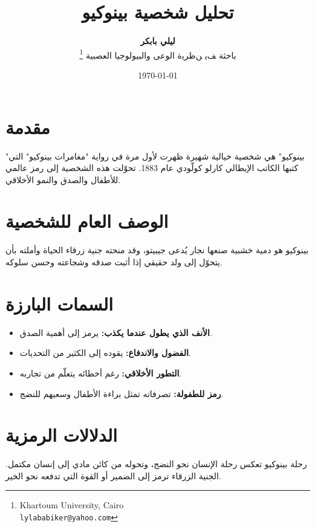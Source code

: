 \documentclass[12pt]{article}
\title{تحليل شخصية بينوكيو}
\author{\textbf{ليلي بابكر}\\    \small باحثة  ﻒﻳ ﻦﻇﺮﻳﺓ الوعى والبيولوجيا العصبية  \thanks{\textenglish{Khartoum University, Cairo \\ \texttt{lylababiker@yahoo.com}}}       }
\date{\today}
\begin{document}
\maketitle

\section{مقدمة}

\begin{flushright} "بينوكيو" هي شخصية خيالية شهيرة ظهرت لأول مرة في رواية "مغامرات بينوكيو" التي كتبها الكاتب الإيطالي كارلو كولّودي عام 1883. تحوّلت هذه الشخصية إلى رمز عالمي للأطفال والصدق والنمو الأخلاقي. \end{flushright}

\section{الوصف العام للشخصية}

\begin{flushright} بينوكيو هو دمية خشبية صنعها نجار يُدعى جيبيتو، وقد منحته جنية زرقاء الحياة وأملته بأن يتحوّل إلى ولد حقيقي إذا أثبت صدقه وشجاعته وحسن سلوكه. \end{flushright}

\section{السمات البارزة}

\begin{itemize} \item \textbf{الأنف الذي يطول عندما يكذب:} يرمز إلى أهمية الصدق. \item \textbf{الفضول والاندفاع:} يقوده إلى الكثير من التحديات. \item \textbf{التطور الأخلاقي:} رغم أخطائه يتعلّم من تجاربه. \item \textbf{رمز للطفولة:} تصرفاته تمثل براءة الأطفال وسعيهم للنضج. \end{itemize}

\section{الدلالات الرمزية}

\begin{flushright} رحلة بينوكيو تعكس رحلة الإنسان نحو النضج، وتحوله من كائن مادي إلى إنسان مكتمل. الجنية الزرقاء ترمز إلى الضمير أو القوة التي تدفعه نحو الخير. \end{flushright}
\end{document}
